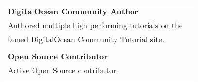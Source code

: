 \documentclass[10pt]{article} %
\newcommand\tab[1][1cm]{\hspace*{#1}}
\begin{document}
\begin{minipage}[t]{0.44\textwidth}
\begin{tabular}{ll}
\textbf{\href{https://www.digitalocean.com/community/users/masonegger?subtype=tutorial}{DigitalOcean Community Author}}\\
\tab Authored multiple high performing tutorials on the  \\
\tab famed DigitalOcean Community Tutorial site. \\
\\

\textbf{\href{https://github.com/masonegger}{Open Source Contributor}}\\
\tab Active Open Source contributor. \\

\end{tabular}\\
    
\end{minipage} %
\end{document}
